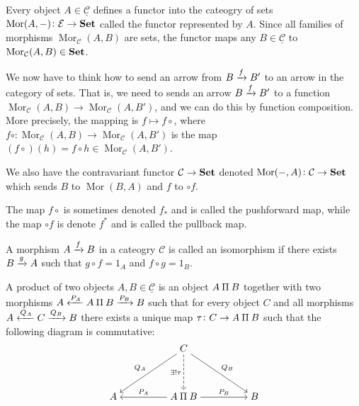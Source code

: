 \documentclass[11pt,a4paper]{article}
\DeclareMathOperator{\Mor}{Mor}
\newcommand{\cprod}{\mathbin{\rotatebox[origin=c]{180}{$\amalg$}}}
\newcommand{\cC}{\mathcal C}
\newcommand{\ucC}{\underline{\cC}}
\begin{document}
\begin{example}
  Every object $A \in \ucC$ defines a functor
  into the cateogry of sets $\Mor(A, -) \colon \mathcal E \to \Set$
  called the functor represented by $A$.
  Since all families of morphisms $\Mor_{\cC}(A,B)$
  are sets, the functor maps any $B \in \ucC$ to $\Mor_{\cC}(A,B) \in \Set$.

  We now have to think how to send an arrow from $B \xrightarrow{f} B'$
  to an arrow in the category of sets.
  That is, we need to sends an arrow $B \xrightarrow{f} B'$ to a function
  $\Mor_{\cC}(A,B) \to \Mor_{\cC}(A,B')$, and we can do this by
  function composition.
  More precisely, the mapping is $f \mapsto f \circ$,
  where $f \circ \colon \Mor_{\cC}(A,B) \to \Mor_{\cC}(A,B')$
  is the map $(f \circ)(h) = f \circ h \in \Mor_{\cC}(A,B')$.
 
  We also have the contravariant functor $\mathcal C \to \mathbf{Set}$
  denoted $\Mor(-,A) \colon \mathcal C \to \Set$
  which sends $B$ to $\Mor(B,A)$ and $f$ to $\circ f$.
\end{example}
\begin{remark}
  The map $f \circ$ is sometimes denoted $f_*$ and is called the
  pushforward map, while the map $\circ f$ is denote $f^*$ and is called the
  pullback map.
\end{remark}

\begin{definition}[Isomorphism]
  A morphism $A \xrightarrow{f} B$ in a cateogry $\cC$ is called an isomorphism
  if there exists $B \xrightarrow{g} A$ such that $g \circ f = 1_A$ and
  $f \circ g = 1_B$.
\end{definition}

\begin{definition}[Product]
  A product of two objects $A,B \in \underline{\mathcal C}$ is an object $A \cprod B$
  together with two morphisms $A \otaking{P_A} A \cprod B \taking{P_B} B$
  such that for every object $C$ and all morphisms $A \xleftarrow{Q_A} C \xrightarrow{Q_B} B$
  there exists a unique map $\tau \colon C \to A \cprod B$
  such that the following diagram is commutative:
  \[\begin{tikzcd}[ampersand replacement=\&,cramped]
    \&\& {C} \\
    \\
    A \&\& {A \cprod B} \&\& B
    \arrow["{Q_A}"', from=1-3, to=3-1]
    \arrow["{\exists ! \tau}"', dashed, from=1-3, to=3-3]
    \arrow["{Q_B}", from=1-3, to=3-5]
    \arrow["{P_A}"', from=3-3, to=3-1]
    \arrow["{P_B}", from=3-3, to=3-5]
  \end{tikzcd}\]
\end{definition}
\end{document}
